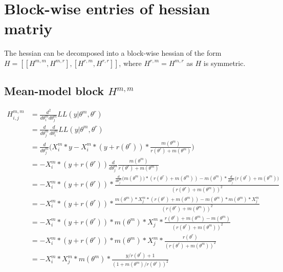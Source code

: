 \documentclass[bibliography=totoc,10pt]{scrartcl}
\begin{document}
\section{Block-wise entries of hessian matriy}
The hessian can be decomposed into a block-wise hessian of the form $H=[[H^{m,m}, H^{m,r}],[H^{r,m},H^{r,r}]]$, where $H^{r,m}=H^{m,r}$ as $H$ is symmetric.

\subsection{Mean-model block $H^{m,m}$}
\begin{equation}
\begin{split}
H^{m,m}_{i,j} &= \frac{d^2}{d \theta^m_i d \theta^m_j} LL(y|\theta^m, \theta^r) \\
&= \frac{d}{d \theta^m_j} \frac{d}{d \theta^m_i} LL(y|\theta^m, \theta^r) \\
&= \frac{d}{d \theta^m_j} \bigg( X^m_{i}*y - X^m_{i}*(y+r(\theta^r))*\frac{m(\theta^m)}{r(\theta^r)+m(\theta^m)} \bigg) \\
&= -X^m_{i}*(y+r(\theta^r)) \frac{d}{d \theta^m_j} \frac{m(\theta^m)}{r(\theta^r)+m(\theta^m)} \\
&=  -X^m_{i}*(y+r(\theta^r))* \frac{\frac{d}{d \theta^m_j} \bigg(m(\theta^m) \bigg) * (r(\theta^r)+m(\theta^m)) - m(\theta^m)* \frac{d}{d \theta^m_j} \bigg(r(\theta^r)+m(\theta^m) \bigg)}{(r(\theta^r)+m(\theta^m))^2 } \\
&=  -X^m_{i}*(y+r(\theta^r))* \frac{ m(\theta^m) * X^m_{j}  * (r(\theta^r)+m(\theta^m)) - m(\theta^m)* m(\theta^m) * X^m_{j} }{(r(\theta^r)+m(\theta^m))^2 } \\
&=  -X^m_{i}*(y+r(\theta^r))* m(\theta^m) * X^m_{j} * \frac{ r(\theta^r)+m(\theta^m) - m(\theta^m)}{(r(\theta^r)+m(\theta^m))^2 } \\
&=  -X^m_{i}*(y+r(\theta^r))* m(\theta^m) * X^m_{j} * \frac{ r(\theta^r)}{(r(\theta^r)+m(\theta^m))^2 } \\
&=  -X^m_{i}* X^m_{j} * m(\theta^m) * \frac{y/r(\theta^r)+1}{(1+m(\theta^m)/r(\theta^r))^2 } \\
\end{split}
\end{equation}
\end{document}

